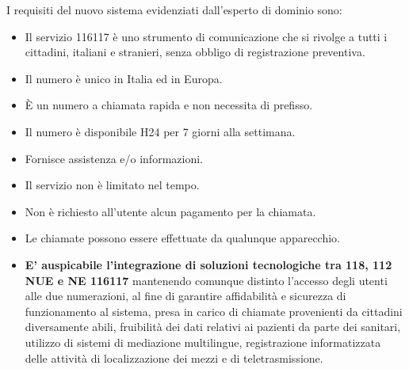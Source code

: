 \documentclass[12pt]{article}
\begin{document}
I requisiti del nuovo sistema evidenziati dall'esperto di dominio sono:
\begin{itemize}
    \item Il servizio 116117 è uno strumento di comunicazione che si rivolge a tutti i cittadini, italiani e stranieri, senza obbligo di registrazione preventiva.
    \item Il numero è unico in Italia ed in Europa.
    \item È un numero a chiamata rapida e non necessita di prefisso.
    \item Il numero è disponibile H24 per 7 giorni alla settimana.
    \item Fornisce assistenza e/o informazioni.
    \item Il servizio non è limitato nel tempo.
    \item Non è richiesto all'utente alcun pagamento per la chiamata.
    \item Le chiamate possono essere effettuate da qualunque apparecchio.
    \item \textbf{E’ auspicabile l’integrazione di soluzioni tecnologiche tra 118, 112 NUE e NE 116117} mantenendo comunque distinto l’accesso degli utenti alle due numerazioni, al fine di garantire affidabilità e sicurezza di funzionamento al sistema, presa in carico di chiamate provenienti da cittadini diversamente abili, fruibilità dei dati relativi ai pazienti da parte dei sanitari, utilizzo di sistemi di mediazione multilingue, registrazione informatizzata delle attività di localizzazione dei mezzi e di teletrasmissione.
   

\end{itemize}
\end{document}
